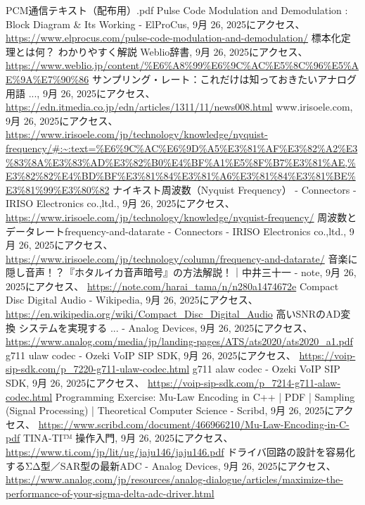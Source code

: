 \documentclass[
  a4paper,  %
  11pt,     %
]{ltjsarticle}%
\begin{document}
\begin{thebibliography}{99}
 PCM通信テキスト（配布用）.pdf
 Pulse Code Modulation and Demodulation : Block Diagram & Its Working - ElProCus, 9月 26, 2025にアクセス、 \url{https://www.elprocus.com/pulse-code-modulation-and-demodulation/}
 標本化定理とは何？ わかりやすく解説 Weblio辞書, 9月 26, 2025にアクセス、 \url{https://www.weblio.jp/content/%E6%A8%99%E6%9C%AC%E5%8C%96%E5%AE%9A%E7%90%86}
 サンプリング・レート：これだけは知っておきたいアナログ用語 ..., 9月 26, 2025にアクセス、 \url{https://edn.itmedia.co.jp/edn/articles/1311/11/news008.html}
 www.irisoele.com, 9月 26, 2025にアクセス、 \url{https://www.irisoele.com/jp/technology/knowledge/nyquist-frequency/#:~:text=%E6%9C%AC%E6%9D%A5%E3%81%AF%E3%82%A2%E3%83%8A%E3%83%AD%E3%82%B0%E4%BF%A1%E5%8F%B7%E3%81%AE,%E3%82%82%E4%BD%BF%E3%81%84%E3%81%A6%E3%81%84%E3%81%BE%E3%81%99%E3%80%82}
 ナイキスト周波数（Nyquist Frequency） - Connectors - IRISO Electronics co.,ltd., 9月 26, 2025にアクセス、 \url{https://www.irisoele.com/jp/technology/knowledge/nyquist-frequency/}
 周波数とデータレートfrequency-and-datarate - Connectors - IRISO Electronics co.,ltd., 9月 26, 2025にアクセス、 \url{https://www.irisoele.com/jp/technology/column/frequency-and-datarate/}
 音楽に隠し音声！？『ホタルイカ音声暗号』の方法解説！｜中井三十一 - note, 9月 26, 2025にアクセス、 \url{https://note.com/harai_tama/n/n280a1474672e}
 Compact Disc Digital Audio - Wikipedia, 9月 26, 2025にアクセス、 \url{https://en.wikipedia.org/wiki/Compact_Disc_Digital_Audio}
 高いSNRのAD変換 システムを実現する ... - Analog Devices, 9月 26, 2025にアクセス、 \url{https://www.analog.com/media/jp/landing-pages/ATS/ats2020/ats2020_a1.pdf}
 g711 ulaw codec - Ozeki VoIP SIP SDK, 9月 26, 2025にアクセス、 \url{https://voip-sip-sdk.com/p_7220-g711-ulaw-codec.html}
 g711 alaw codec - Ozeki VoIP SIP SDK, 9月 26, 2025にアクセス、 \url{https://voip-sip-sdk.com/p_7214-g711-alaw-codec.html}
 Programming Exercise: Mu-Law Encoding in C++ | PDF | Sampling (Signal Processing) | Theoretical Computer Science - Scribd, 9月 26, 2025にアクセス、 \url{https://www.scribd.com/document/466966210/Mu-Law-Encoding-in-C-pdf}
 TINA-TI™ 操作入門, 9月 26, 2025にアクセス、 \url{https://www.ti.com/jp/lit/ug/jaju146/jaju146.pdf}
 ドライバ回路の設計を容易化するΣΔ型／SAR型の最新ADC - Analog Devices, 9月 26, 2025にアクセス、 \url{https://www.analog.com/jp/resources/analog-dialogue/articles/maximize-the-performance-of-your-sigma-delta-adc-driver.html}

\end{thebibliography}
\end{document}
